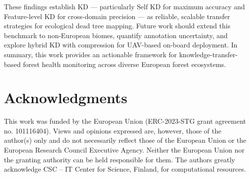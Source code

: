 \documentclass[twocolumn]{article}
\begin{document}
These findings establish KD — particularly Self KD for maximum accuracy and Feature-level KD for cross-domain precision — as reliable, scalable transfer strategies for ecological dead tree mapping. Future work should extend this benchmark to non-European biomes, quantify annotation uncertainty, and explore hybrid KD with compression for UAV-based on-board deployment. In summary, this work provides an actionable framework for knowledge-transfer-based forest health monitoring across diverse European forest ecosystems.

\section*{Acknowledgments}

This work was funded by the European Union (ERC-2023-STG grant agreement no. 101116404). Views and opinions expressed are, however, those of the author(s) only and do not necessarily reflect those of the European Union or the European Research Council Executive Agency. Neither the European Union nor the granting authority can be held responsible for them. The authors greatly acknowledge CSC -- IT Center for Science, Finland, for computational resources.


 
\end{document}
